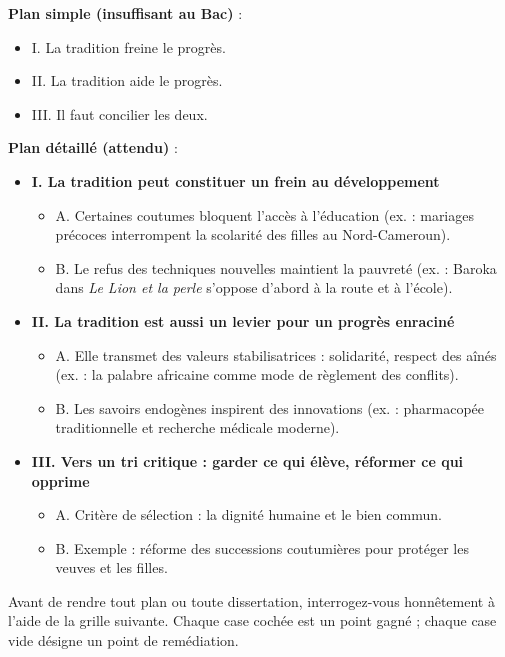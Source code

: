 \documentclass[11pt]{article}
\newcounter{popsec}
\newcounter{popsub}
\newcommand{\courssub}[1]{%
  \stepcounter{popsub}%
  \par\vspace{9pt}\noindent{\popxbold\fontsize{11.5}{13}\selectfont\color{popink}{\color{poporange}\thepopsec.\thepopsub}\hspace{6pt}#1}\par\nopagebreak\vspace{4pt}
}
\begin{document}
\begin{exemplebox}
\textbf{Plan simple (insuffisant au Bac)} :
\begin{itemize}
\item I. La tradition freine le progrès.
\item II. La tradition aide le progrès.
\item III. Il faut concilier les deux.
\end{itemize}

\textbf{Plan détaillé (attendu)} :
\begin{itemize}
\item \textbf{I. La tradition peut constituer un frein au développement}
  \begin{itemize}
  \item A. Certaines coutumes bloquent l'accès à l'éducation (ex. : mariages précoces interrompent la scolarité des filles au Nord-Cameroun).
  \item B. Le refus des techniques nouvelles maintient la pauvreté (ex. : Baroka dans \emph{Le Lion et la perle} s'oppose d'abord à la route et à l'école).
  \end{itemize}
\item \textbf{II. La tradition est aussi un levier pour un progrès enraciné}
  \begin{itemize}
  \item A. Elle transmet des valeurs stabilisatrices : solidarité, respect des aînés (ex. : la palabre africaine comme mode de règlement des conflits).
  \item B. Les savoirs endogènes inspirent des innovations (ex. : pharmacopée traditionnelle et recherche médicale moderne).
  \end{itemize}
\item \textbf{III. Vers un tri critique : garder ce qui élève, réformer ce qui opprime}
  \begin{itemize}
  \item A. Critère de sélection : la dignité humaine et le bien commun.
  \item B. Exemple : réforme des successions coutumières pour protéger les veuves et les filles.
  \end{itemize}
\end{itemize}
\end{exemplebox}

\courssub{Grille d'auto-évaluation}

Avant de rendre tout plan ou toute dissertation, interrogez-vous honnêtement à l'aide de la grille suivante. Chaque case cochée est un point gagné ; chaque case vide désigne un point de remédiation.
\end{document}
